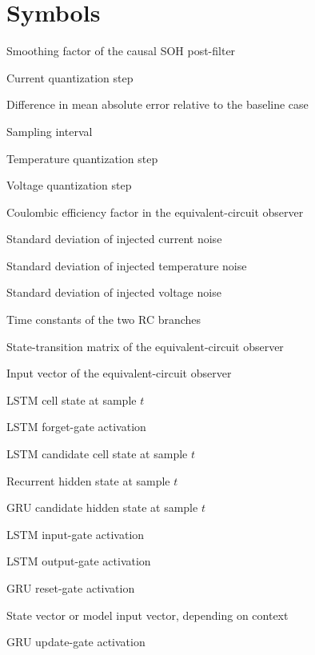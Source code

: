 \documentclass[
    a4paper,
    12pt,
    titlepage,
    bibliography=totoc,
    twoside=on,
    parskip=false,
    numbers=noenddot,
    cleardoublepage=empty,
    DIV=12,
    BCOR=12.0mm,
    headheight=36pt,
    headings=openright
]{scrreprt}
\begin{document}
\chapter*{Symbols}
\begin{description}[style=nextline,leftmargin=3.2cm]
\item[$\alpha$] Smoothing factor of the causal SOH post-filter
\item[$\Delta I$] Current quantization step
\item[$\Delta\mathrm{MAE}$] Difference in mean absolute error relative to the baseline case
\item[$\Delta t$] Sampling interval
\item[$\Delta T$] Temperature quantization step
\item[$\Delta U$] Voltage quantization step
\item[$\eta$] Coulombic efficiency factor in the equivalent-circuit observer
\item[$\sigma_I$] Standard deviation of injected current noise
\item[$\sigma_T$] Standard deviation of injected temperature noise
\item[$\sigma_U$] Standard deviation of injected voltage noise
\item[$\tau_1,\tau_2$] Time constants of the two RC branches
\item[$\mathbf{A}$] State-transition matrix of the equivalent-circuit observer
\item[$\mathbf{b}$] Input vector of the equivalent-circuit observer
\item[$\mathbf{c}_t$] LSTM cell state at sample $t$
\item[$\mathbf{f}_t$] LSTM forget-gate activation
\item[$\tilde{\mathbf{c}}_t$] LSTM candidate cell state at sample $t$
\item[$\mathbf{h}_t$] Recurrent hidden state at sample $t$
\item[$\tilde{\mathbf{h}}_t$] GRU candidate hidden state at sample $t$
\item[$\mathbf{i}_t$] LSTM input-gate activation
\item[$\mathbf{o}_t$] LSTM output-gate activation
\item[$\mathbf{r}_t$] GRU reset-gate activation
\item[$\mathbf{x}$] State vector or model input vector, depending on context
\item[$\mathbf{z}_t$] GRU update-gate activation

\end{description}
\end{document}

